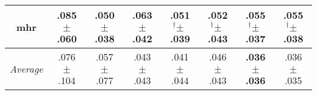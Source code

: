 \begin{tabular}{|c|ccccccc|}
mhr & .085$^{\phantom{\dag}}\pm^{\phantom{\dag}}$.060\cellcolor{red!40} & \textbf{.050$^{\phantom{\dag}}\pm^{\phantom{\dag}}$.038}\cellcolor{green!40} & .063$^{\phantom{\dag}}\pm^{\phantom{\dag}}$.042\cellcolor{green!11} & .051$^{\dag}\pm^{\phantom{\dag}}$.039\cellcolor{green!38} & .052$^{\dag}\pm^{\phantom{\dag}}$.043\cellcolor{green!36} & .055$^{\dag}\pm^{\phantom{\dag}}$.037\cellcolor{green!29} & .055$^{\dag}\pm^{\phantom{\dag}}$.038\cellcolor{green!29} \\\hline
\textit{Average} & .076$^{\phantom{\dag}}\pm^{\phantom{\dag}}$.104\cellcolor{red!40} & .057$^{\phantom{\dag}}\pm^{\phantom{\dag}}$.077\cellcolor{red!2} & .043$^{\phantom{\dag}}\pm^{\phantom{\dag}}$.043\cellcolor{green!26} & .041$^{\phantom{\dag}}\pm^{\phantom{\dag}}$.044\cellcolor{green!29} & .046$^{\phantom{\dag}}\pm^{\phantom{\dag}}$.043\cellcolor{green!20} & \textbf{.036$^{\phantom{\dag}}\pm^{\phantom{\dag}}$.036}\cellcolor{green!40} & .036$^{\phantom{\dag}}\pm^{\phantom{\dag}}$.035\cellcolor{green!39} \\\hline
\end{tabular}